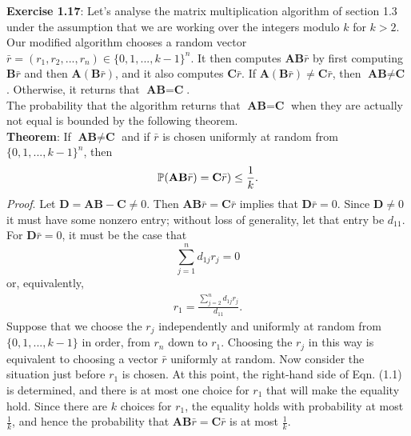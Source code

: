 \textbf{Exercise 1.17}: Let's analyse the matrix multiplication algorithm of
section 1.3 under the assumption that we are working over the integers modulo $k$
for $k > 2$. \\
Our modified algorithm chooses a random vector $\bar{r} = (r_1, r_2, ..., r_n)
\in \{ 0, 1, ..., k-1 \} ^n$. It then computes $\textbf{AB}\bar{r}$ by first
computing $\textbf{B}\bar{r}$ and then $\textbf{A}(\textbf{B} \bar{r})$, and it
also computes $\textbf{C} \bar{r}$. If $\textbf{A}(\textbf{B}\bar{r}) \not=
\textbf{C}\bar{r}$, then $\textbf{AB} \not= \textbf{C}$. Otherwise, it returns
that $\textbf{AB} = \textbf{C}$. \\
The probability that the algorithm returns that $\textbf{AB} = \textbf{C}$ when
they are actually not equal is bounded by the following theorem. \\
\textbf{Theorem}: If $\textbf{AB} \not= \textbf{C}$ and if $\bar{r}$ is chosen
uniformly at random from $\{ 0, 1, ..., k-1 \} ^n$, then
\[ \mathbb{P}(\textbf{AB}\bar{r}) = \textbf{C}\bar{r}) \leq \frac{1}{k}. \]
\textit{Proof}. Let $\textbf{D} = \textbf{AB} - \textbf{C} \not= 0$. Then
$\textbf{AB}\bar{r} = \textbf{C}\bar{r}$ implies that $\textbf{D}\bar{r} = 0$.
Since $\textbf{D} \not= 0$ it must have some nonzero entry; without loss of
generality, let that entry be $d_{11}$. \\
For $\textbf{D}\bar{r} = 0$, it must be the case that
\[ \sum_{j=1}^n d_{1j}r_j = 0 \]
or, equivalently,
\begin{align} r_1 = \frac{\sum_{j=2}^n d_{1j}r_j}{d_{11}}. \end{align}
Suppose that we choose the $r_j$ independently and uniformly at random from
$\{ 0, 1, ..., k-1 \}$ in order, from $r_n$ down to $r_1$. Choosing the $r_j$ in
this way is equivalent to choosing a vector $\bar{r}$ uniformly at random. Now
consider the situation just before $r_1$ is chosen. At this point, the right-hand
side of Eqn. (1.1) is determined, and there is at most one choice for $r_1$ that
will make the equality hold. Since there are $k$ choices for $r_1$, the equality
holds with probability at most $\frac{1}{k}$, and hence the probability that
$\textbf{AB}\bar{r} = \textbf{C}\bar{r}$ is at most $\frac{1}{k}$.
\\[0.5cm]
